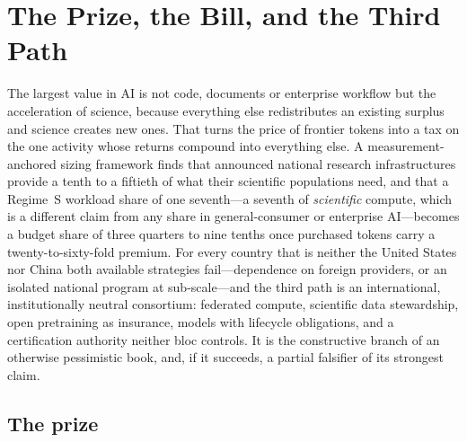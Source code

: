 \chapter{The Prize, the Bill, and the Third Path}
\label{c:science}

\begin{glance}
The largest value in AI is not code, documents or enterprise workflow but the acceleration of science, because everything else redistributes an existing surplus and science creates new ones. That turns the price of frontier tokens into a tax on the one activity whose returns compound into everything else. A measurement-anchored sizing framework finds that announced national research infrastructures provide a tenth to a fiftieth of what their scientific populations need, and that a Regime~S workload share of one seventh---a seventh of \emph{scientific} compute, which is a different claim from any share in general-consumer or enterprise AI---becomes a budget share of three quarters to nine tenths once purchased tokens carry a twenty-to-sixty-fold premium. For every country that is neither the United States nor China both available strategies fail---dependence on foreign providers, or an isolated national program at sub-scale---and the third path is an international, institutionally neutral consortium: federated compute, scientific data stewardship, open pretraining as insurance, models with lifecycle obligations, and a certification authority neither bloc controls. It is the constructive branch of an otherwise pessimistic book, and, if it succeeds, a partial falsifier of its strongest claim.
\end{glance}

\section{The prize}

